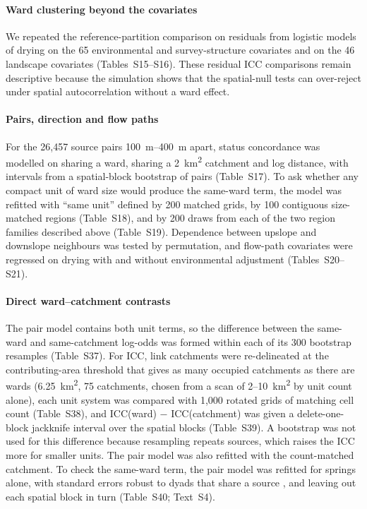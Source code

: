 \documentclass[preprint,12pt,authoryear]{elsarticle}
\begin{document}
\paragraph{Ward clustering beyond the covariates} We repeated the reference-partition comparison on residuals from logistic models of drying on the 65 environmental and survey-structure covariates and on the 46 landscape covariates (Tables~S15--S16). These residual ICC comparisons remain descriptive because the simulation shows that the spatial-null tests can over-reject under spatial autocorrelation without a ward effect.
\paragraph{Pairs, direction and flow paths} For the 26,457 source pairs \SIrange{100}{400}{\metre} apart, status concordance was modelled on sharing a ward, sharing a \SI{2}{\kilo\metre\squared} catchment and log distance, with intervals from a spatial-block bootstrap of pairs (Table~S17). To ask whether any compact unit of ward size would produce the same-ward term, the model was refitted with ``same unit'' defined by 200 matched grids, by 100 contiguous size-matched regions (Table~S18), and by 200 draws from each of the two region families described above (Table~S19). Dependence between upslope and downslope neighbours was tested by permutation, and flow-path covariates were regressed on drying with and without environmental adjustment (Tables~S20--S21).
\paragraph{Direct ward--catchment contrasts} The pair model contains both unit terms, so the difference between the same-ward and same-catchment log-odds was formed within each of its 300 bootstrap resamples (Table~S37). For ICC, link catchments were re-delineated at the contributing-area threshold that gives as many occupied catchments as there are wards (\SI{6.25}{\kilo\metre\squared}, 75 catchments, chosen from a scan of 2--\SI{10}{\kilo\metre\squared} by unit count alone), each unit system was compared with 1,000 rotated grids of matching cell count (Table~S38), and ICC(ward) $-$ ICC(catchment) was given a delete-one-block jackknife interval over the spatial blocks (Table~S39). A bootstrap was not used for this difference because resampling repeats sources, which raises the ICC more for smaller units. The pair model was also refitted with the count-matched catchment. To check the same-ward term, the pair model was refitted for springs alone, with standard errors robust to dyads that share a source \citep{aronow2015cluster}, and leaving out each spatial block in turn (Table~S40; Text~S4).
\end{document}
